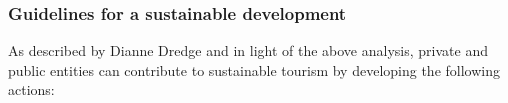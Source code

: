 \documentclass[sustainability,article,submit,pdftex,moreauthors]{Definitions/mdpi}
\begin{document}
%
%
%

\subsubsection{Guidelines for a sustainable development}

As described by \cite{dre22} Dianne Dredge and in light of the above analysis, private and public entities can contribute to sustainable tourism  by developing the following actions: 

\end{document}
